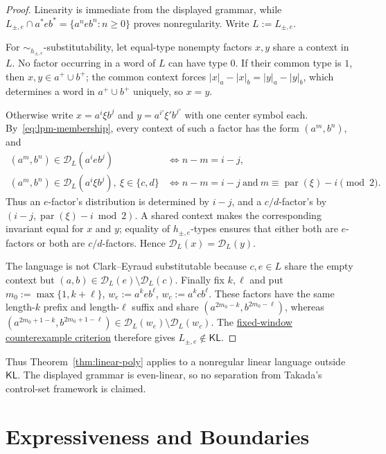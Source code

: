 \documentclass[11pt,a4paper]{article}
\theoremstyle{remark}
\theoremstyle{plain}
\newcommand{\D}{\mathcal{D}}
\begin{document}
\begin{proof}
Linearity is immediate from the displayed grammar, while
$L_{\pm,e}\cap a^*eb^*=\{a^neb^n:n\ge0\}$ proves nonregularity.  Write
$L:=L_{\pm,e}$.

For $\sim_{h_{\pm,e}}$-substitutability, let equal-type nonempty factors
$x,y$ share a context in $L$.  No factor occurring in a word of $L$ can have
type $0$.  If their common type is $1$, then
$x,y\in a^+\cup b^+$; the common context forces
$|x|_a-|x|_b=|y|_a-|y|_b$, which determines a word in
$a^+\cup b^+$ uniquely, so $x=y$.

Otherwise write $x=a^i\xi b^j$ and $y=a^{i'}\xi'b^{j'}$ with one center
symbol each.  By~\eqref{eq:lpm-membership}, every context of such a factor
has the form $(a^m,b^n)$, and
\[
\begin{array}{ll}
(a^m,b^n)\in\D_L(a^ieb^j)
 &\Longleftrightarrow n-m=i-j,\\
(a^m,b^n)\in\D_L(a^i\xi b^j),\ \xi\in\{c,d\}
 &\Longleftrightarrow
 n-m=i-j\ \text{and}\
 m\equiv\operatorname{par}(\xi)-i\pmod2.
\end{array}
\]
Thus an $e$-factor's distribution is determined by $i-j$, and a $c/d$-factor's
by $(i-j,\operatorname{par}(\xi)-i\bmod2)$.  A shared context makes the corresponding invariant equal for $x$ and $y$;
equality of $h_{\pm,e}$-types ensures that either both are $e$-factors or
both are $c/d$-factors.  Hence $\D_L(x)=\D_L(y)$.

The language is not Clark--Eyraud substitutable because $c,e\in L$ share the
empty context but $(a,b)\in\D_L(e)\setminus\D_L(c)$.  Finally fix
$k,\ell$ and put $m_0:=\max\{1,k+\ell\}$,
$w_e:=a^keb^\ell$, $w_c:=a^kcb^\ell$.  These factors have the same
length-$k$ prefix and length-$\ell$ suffix and share
$(a^{2m_0-k},b^{2m_0-\ell})$, whereas
$(a^{2m_0+1-k},b^{2m_0+1-\ell})
 \in\D_L(w_e)\setminus\D_L(w_c)$.
The \hyperref[crit:kl]{fixed-window counterexample criterion} therefore gives
$L_{\pm,e}\notin\mathsf{KL}$.
\end{proof}

Thus Theorem~\ref{thm:linear-poly} applies to a nonregular linear language
outside $\mathsf{KL}$.  The displayed grammar is even-linear, so no
separation from Takada's control-set framework is claimed.

\section{Expressiveness and Boundaries}
\label{sec:boundaries}
\end{document}
